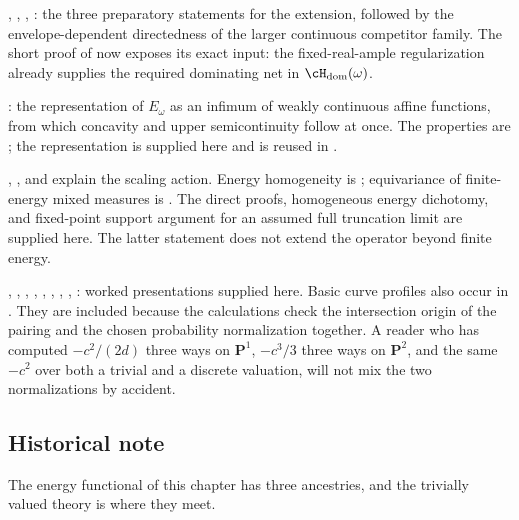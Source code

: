 ,
,
,
: the three preparatory statements
for the extension, followed by the envelope-dependent directedness of the
larger continuous competitor family.  The short proof of
 now exposes its exact input: the
fixed-real-ample regularization
 already supplies the required
dominating net in $\cH_{\mathrm{dom}}(\omega)$.

: the representation of $E_\omega$ as an
infimum of weakly continuous affine functions, from which concavity and
upper semicontinuity follow at once.  The properties are
\cite[Proposition~7.7]{BJ22}; the representation is supplied here and is
reused in .

,
, and
 explain the scaling action.
Energy homogeneity is \cite[Proposition~7.7(iii)]{BJ22}; equivariance of
finite-energy mixed measures is \cite[Proposition~7.19(iii)]{BJ22}.
The direct proofs, homogeneous energy dichotomy, and fixed-point support
argument for an assumed full truncation limit are supplied here.
The latter statement does not extend the operator beyond finite energy.

,
,
,
,
,
,
,
,
: worked presentations supplied here. Basic curve profiles also occur in
\cite[Examples~3.18--3.19 and~7.20]{BJ22}. They are included because
the calculations check the intersection origin of the pairing and the
chosen probability normalization together.  A reader who has computed $-c^2/(2d)$ three ways on $\mathbf P^1$,
$-c^3/3$ three ways on $\mathbf P^2$, and the same $-c^2$ over both a
trivial and a discrete valuation, will not mix the two normalizations by
accident.

\subsection{Historical note}
\label{sec:ch46-history}

The energy functional of this chapter has three ancestries, and the
trivially valued theory is where they meet.

